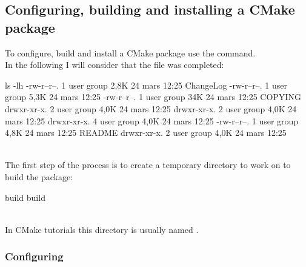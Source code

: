 \subsection{Configuring, building and installing a CMake package}

To configure, build and install a CMake package use the  command. \\
In the following I will consider that the file  was completed: 
{\footnotesize{
\begin{script}
 ls -lh
-rw-r--r--. 1 user group 2,8K 24 mars  12:25 ChangeLog
-rw-r--r--. 1 user group 5,3K 24 mars  12:25 
-rw-r--r--. 1 user group  34K 24 mars  12:25 COPYING
drwxr-xr-x. 2 user group 4,0K 24 mars  12:25 
drwxr-xr-x. 2 user group 4,0K 24 mars  12:25 
drwxr-xr-x. 4 user group 4,0K 24 mars  12:25 
-rw-r--r--. 1 user group 4,8K 24 mars  12:25 README
drwxr-xr-x. 2 user group 4,0K 24 mars  12:25 
\end{script}
}}\\[-0.25cm]
\noindent The first step of the process is to create a temporary directory to work on to build the package:
{\footnotesize{
\begin{script}
  build
  build
\end{script}
}}\\[-0.25cm]
\noindent In CMake tutorials this directory is usually named . 

\subsubsection*{Configuring}

